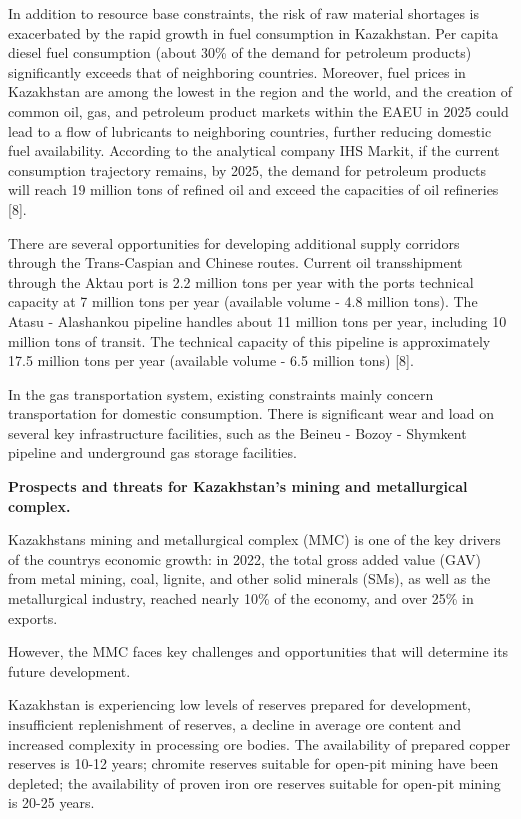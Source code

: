 \begin{multicols}{2}
In addition to resource base constraints, the risk of raw material
shortages is exacerbated by the rapid growth in fuel consumption in
Kazakhstan. Per capita diesel fuel consumption (about 30\% of the demand
for petroleum products) significantly exceeds that of neighboring
countries. Moreover, fuel prices in Kazakhstan are among the lowest in
the region and the world, and the creation of common oil, gas, and
petroleum product markets within the EAEU in 2025 could lead to a flow
of lubricants to neighboring countries, further reducing domestic fuel
availability. According to the analytical company IHS Markit, if the
current consumption trajectory remains, by 2025, the demand for
petroleum products will reach 19 million tons of refined oil and exceed
the capacities of oil refineries {[}8{]}.

There are several opportunities for developing additional supply
corridors through the Trans-Caspian and Chinese routes. Current oil
transshipment through the Aktau port is 2.2 million tons per year with
the port\textquotesingle s technical capacity at 7 million tons per year
(available volume - 4.8 million tons). The Atasu - Alashankou pipeline
handles about 11 million tons per year, including 10 million tons of
transit. The technical capacity of this pipeline is approximately 17.5
million tons per year (available volume - 6.5 million tons) {[}8{]}.

In the gas transportation system, existing constraints mainly concern
transportation for domestic consumption. There is significant wear and
load on several key infrastructure facilities, such as the Beineu -
Bozoy - Shymkent pipeline and underground gas storage facilities.

{\bfseries Prospects and threats for Kazakhstan's mining and metallurgical
complex.}

Kazakhstan\textquotesingle s mining and metallurgical complex (MMC) is
one of the key drivers of the country\textquotesingle s economic growth:
in 2022, the total gross added value (GAV) from metal mining, coal,
lignite, and other solid minerals (SMs), as well as the metallurgical
industry, reached nearly 10\% of the economy, and over 25\% in exports.

However, the MMC faces key challenges and opportunities that will
determine its future development.

Kazakhstan is experiencing low levels of reserves prepared for
development, insufficient replenishment of reserves, a decline in
average ore content and increased complexity in processing ore bodies.
The availability of prepared copper reserves is 10-12 years; chromite
reserves suitable for open-pit mining have been depleted; the
availability of proven iron ore reserves suitable for open-pit mining is
20-25 years.


\end{multicols}
